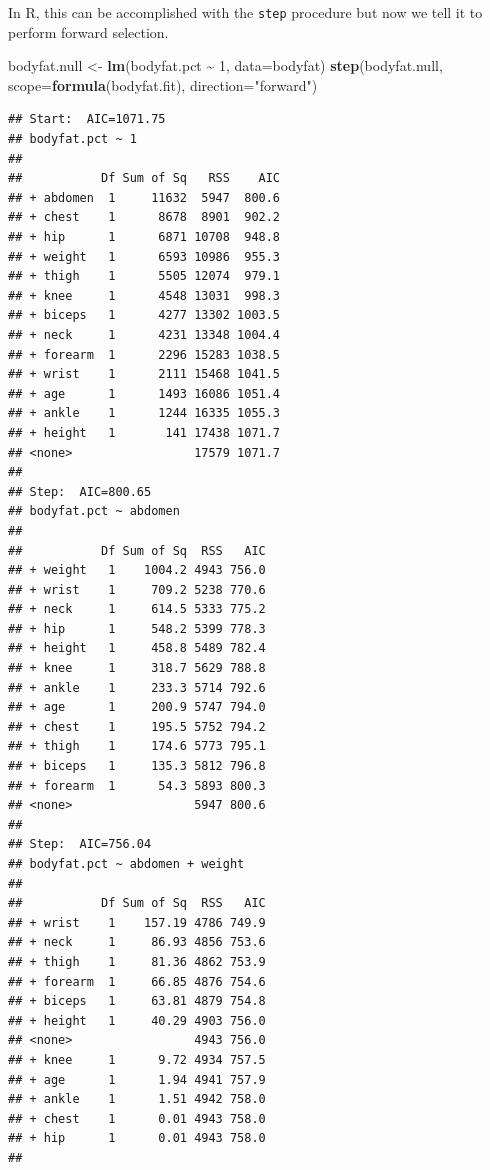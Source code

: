 \documentclass[
]{book}
\newenvironment{Shaded}{\begin{snugshade}}{\end{snugshade}}
\newcommand{\AttributeTok}[1]{\textcolor[rgb]{0.13,0.29,0.53}{#1}}
\newcommand{\DecValTok}[1]{\textcolor[rgb]{0.00,0.00,0.81}{#1}}
\newcommand{\FunctionTok}[1]{\textcolor[rgb]{0.13,0.29,0.53}{\textbf{#1}}}
\newcommand{\NormalTok}[1]{#1}
\newcommand{\OtherTok}[1]{\textcolor[rgb]{0.56,0.35,0.01}{#1}}
\newcommand{\SpecialCharTok}[1]{\textcolor[rgb]{0.81,0.36,0.00}{\textbf{#1}}}
\newcommand{\StringTok}[1]{\textcolor[rgb]{0.31,0.60,0.02}{#1}}
\begin{document}
In R, this can be accomplished with the \texttt{step} procedure but now we tell it to perform forward selection.

\begin{Shaded}
\begin{Highlighting}[]
\NormalTok{bodyfat.null }\OtherTok{\textless{}{-}} \FunctionTok{lm}\NormalTok{(bodyfat.pct }\SpecialCharTok{\textasciitilde{}} \DecValTok{1}\NormalTok{, }\AttributeTok{data=}\NormalTok{bodyfat)}
\FunctionTok{step}\NormalTok{(bodyfat.null, }\AttributeTok{scope=}\FunctionTok{formula}\NormalTok{(bodyfat.fit), }\AttributeTok{direction=}\StringTok{"forward"}\NormalTok{)}
\end{Highlighting}
\end{Shaded}

\begin{verbatim}
## Start:  AIC=1071.75
## bodyfat.pct ~ 1
## 
##           Df Sum of Sq   RSS    AIC
## + abdomen  1     11632  5947  800.6
## + chest    1      8678  8901  902.2
## + hip      1      6871 10708  948.8
## + weight   1      6593 10986  955.3
## + thigh    1      5505 12074  979.1
## + knee     1      4548 13031  998.3
## + biceps   1      4277 13302 1003.5
## + neck     1      4231 13348 1004.4
## + forearm  1      2296 15283 1038.5
## + wrist    1      2111 15468 1041.5
## + age      1      1493 16086 1051.4
## + ankle    1      1244 16335 1055.3
## + height   1       141 17438 1071.7
## <none>                 17579 1071.7
## 
## Step:  AIC=800.65
## bodyfat.pct ~ abdomen
## 
##           Df Sum of Sq  RSS   AIC
## + weight   1    1004.2 4943 756.0
## + wrist    1     709.2 5238 770.6
## + neck     1     614.5 5333 775.2
## + hip      1     548.2 5399 778.3
## + height   1     458.8 5489 782.4
## + knee     1     318.7 5629 788.8
## + ankle    1     233.3 5714 792.6
## + age      1     200.9 5747 794.0
## + chest    1     195.5 5752 794.2
## + thigh    1     174.6 5773 795.1
## + biceps   1     135.3 5812 796.8
## + forearm  1      54.3 5893 800.3
## <none>                 5947 800.6
## 
## Step:  AIC=756.04
## bodyfat.pct ~ abdomen + weight
## 
##           Df Sum of Sq  RSS   AIC
## + wrist    1    157.19 4786 749.9
## + neck     1     86.93 4856 753.6
## + thigh    1     81.36 4862 753.9
## + forearm  1     66.85 4876 754.6
## + biceps   1     63.81 4879 754.8
## + height   1     40.29 4903 756.0
## <none>                 4943 756.0
## + knee     1      9.72 4934 757.5
## + age      1      1.94 4941 757.9
## + ankle    1      1.51 4942 758.0
## + chest    1      0.01 4943 758.0
## + hip      1      0.01 4943 758.0
## 

\end{verbatim}
\end{document}
